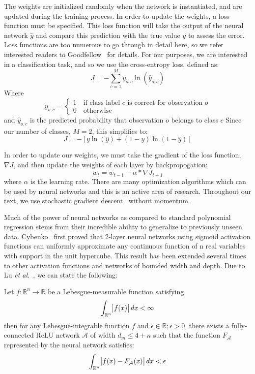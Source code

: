 The weights are initialized randomly when the network is instantiated, and are updated during the training process.
In order to update the weights, a loss function must be specified.
This loss function will take the output of the neural network $\hat{y}$ and compare this prediction with the true value $y$ to assess the error.
Loss functions are too numerous to go through in detail here, so we refer interested readers to Goodfellow~\cite{goodfellow2016deep} for details.
For our purposes, we are interested in a classification task, and so we use the cross-entropy loss, defined as:
$$J = -\sum_{c=1}^{M} y_{o,c} \ln(\hat{y}_{o,c})$$
Where
$$y_{o,c} =
\begin{cases}
1 \quad\text{if class label $c$ is correct for observation $o$}\\
0 \quad\text{otherwise}	
\end{cases}
$$
and $\hat{y}_{o,c}$ is the predicted probability that observation $o$ belongs to class $c$
Since our number of classes, $M = 2$, this simplifies to:
$$J = -[y \ln(\hat{y}) + (1 - y) \ln(1 - \hat{y})]$$

In order to update our weights, we must take the gradient of the loss function, $\nabla J$, and then update the weights of each layer by backpropogation: 
$$w_t = w_{t-1} - \alpha * \nabla J_{t-1}$$
where $\alpha$ is the learning rate.
There are many optimization algorithms which can be used by neural networks and this is an active area of research.
Throughout our text, we use stochastic gradient descent~\cite{hastie01statisticallearning} without momentum.

Much of the power of neural networks as compared to standard polynomial regression stems from their incredible ability to generalize to previously unseen data.
Cybenko~\cite{cybenko1989approximation} first proved that 2-layer neural networks using sigmoid activation functions can uniformly approximate any continuous function of n real variables with support in the unit hypercube.
This result has been extended several times to other activation functions and networks of bounded width and depth. 
Due to Lu \textit{et al.}~\cite{lu2017expressive}, we can state the following:

\begin{theorem}
Let $f: \mathbb{R}^n \to \mathbb{R}$ be a Lebesgue-measurable function satisfying
$$\int_{\mathbb{R}^n} \abs{f(x)} dx < \infty$$
then for any Lebesgue-integrable function $f$ and $\epsilon \in \mathbb{R}; \epsilon > 0$, there exists a fully-connected ReLU network $\mathcal{A}$ of width $d_m \leq 4 + n$ such that the function $F_{\mathcal{A}}$ represented by the neural network satisfies:
$$\int_{\mathbb{R}^n} \abs{f(x) - F_{\mathcal{A}}(x)}dx < \epsilon$$
\end{theorem}

